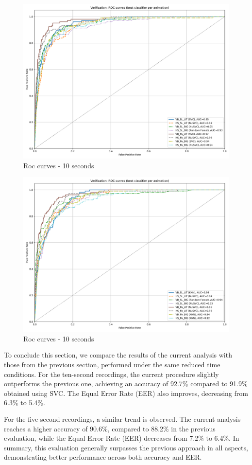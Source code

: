 \documentclass{article}
\begin{document}
\begin{figure}[ht]
    \centering
    \includegraphics[width = 0.6
    \textwidth]{Images/Results/Classic_procedure/five_ten/ft/ten/Verification_single_roc_ten_classic_ft.png}
    \caption{Roc curves - 10 seconds}
    \label{fig:roc_cft_10}
\end{figure}

\begin{figure}[ht]
    \centering
    \includegraphics[width = 0.6
    \textwidth]{Images/Results/Classic_procedure/five_ten/ft/five/Verification_single_roc_five_classic_ft.png}
    \caption{Roc curves - 10 seconds}
    \label{fig:roc_cft_5}
\end{figure}

To conclude this section, we compare the results of the current analysis with those from the previous section, performed under the same reduced time conditions.
For the ten-second recordings, the current procedure slightly outperforms the previous one, achieving an accuracy of 92.7\% compared to 91.9\% obtained using SVC. 
The Equal Error Rate (EER) also improves, decreasing from 6.3\% to 5.4\%.

For the five-second recordings, a similar trend is observed. 
The current analysis reaches a higher accuracy of 90.6\%, compared to 88.2\% in the previous evaluation, while the Equal Error Rate (EER) decreases from 7.2\% to 6.4\%.
In summary, this evaluation generally surpasses the previous approach in all aspects, demonstrating better performance across both accuracy and EER.
\end{document}
